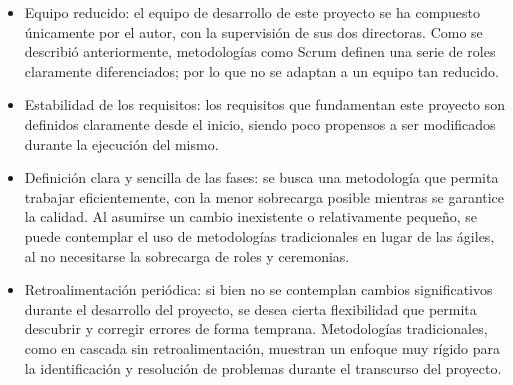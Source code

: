 \begin{itemize}
    \item Equipo reducido: el equipo de desarrollo de este proyecto se ha compuesto únicamente por el autor, con la supervisión de sus dos directoras. Como se describió anteriormente, metodologías como Scrum definen una serie de roles claramente diferenciados; por lo que no se adaptan a un equipo tan reducido.
    \item Estabilidad de los requisitos: los requisitos que fundamentan este proyecto son definidos claramente desde el inicio, siendo poco propensos a ser modificados durante la ejecución del mismo. 
    \item Definición clara y sencilla de las fases: se busca una metodología que permita trabajar eficientemente, con la menor sobrecarga posible mientras se garantice la calidad. Al asumirse un cambio inexistente o relativamente pequeño, se puede contemplar el uso de metodologías tradicionales en lugar de las ágiles, al no necesitarse la sobrecarga de roles y ceremonias. 
    \item Retroalimentación periódica: si bien no se contemplan cambios significativos durante el desarrollo del proyecto, se desea cierta flexibilidad que permita descubrir y corregir errores de forma temprana. Metodologías tradicionales, como en cascada sin retroalimentación, muestran un enfoque muy rígido para la identificación y resolución de problemas durante el transcurso del proyecto.
\end{itemize}



